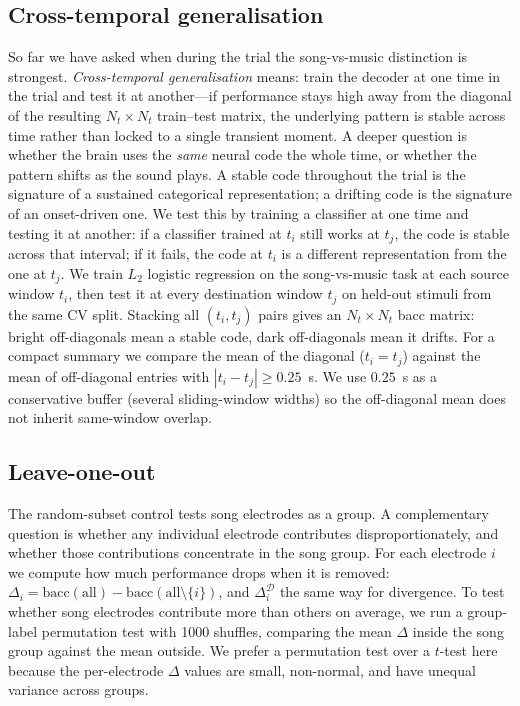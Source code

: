 \documentclass[11pt]{article}
\newcommand{\divg}{\mathcal{D}}
\begin{document}
\subsection{Cross-temporal generalisation}
So far we have asked when during the trial the song-vs-music distinction is strongest. \emph{Cross-temporal generalisation} means: train the decoder at one time in the trial and test it at another---if performance stays high away from the diagonal of the resulting $N_t\times N_t$ train--test matrix, the underlying pattern is stable across time rather than locked to a single transient moment. A deeper question is whether the brain uses the \emph{same} neural code the whole time, or whether the pattern shifts as the sound plays. A stable code throughout the trial is the signature of a sustained categorical representation; a drifting code is the signature of an onset-driven one. We test this by training a classifier at one time and testing it at another: if a classifier trained at $t_i$ still works at $t_j$, the code is stable across that interval; if it fails, the code at $t_i$ is a different representation from the one at $t_j$. We train $L_2$ logistic regression on the song-vs-music task at each source window $t_i$, then test it at every destination window $t_j$ on held-out stimuli from the same CV split. Stacking all $(t_i, t_j)$ pairs gives an $N_t \times N_t$ bacc matrix: bright off-diagonals mean a stable code, dark off-diagonals mean it drifts. For a compact summary we compare the mean of the diagonal ($t_i = t_j$) against the mean of off-diagonal entries with $|t_i - t_j| \geq 0.25$~s. We use $0.25$~s as a conservative buffer (several sliding-window widths) so the off-diagonal mean does not inherit same-window overlap.

\subsection{Leave-one-out}
The random-subset control tests song electrodes as a group. A complementary question is whether any individual electrode contributes disproportionately, and whether those contributions concentrate in the song group. For each electrode $i$ we compute how much performance drops when it is removed: $\Delta_i = \text{bacc}(\text{all}) - \text{bacc}(\text{all} \setminus \{i\})$, and $\Delta_i^{\divg}$ the same way for divergence. To test whether song electrodes contribute more than others on average, we run a group-label permutation test with 1000 shuffles, comparing the mean $\Delta$ inside the song group against the mean outside. We prefer a permutation test over a $t$-test here because the per-electrode $\Delta$ values are small, non-normal, and have unequal variance across groups.
\end{document}
